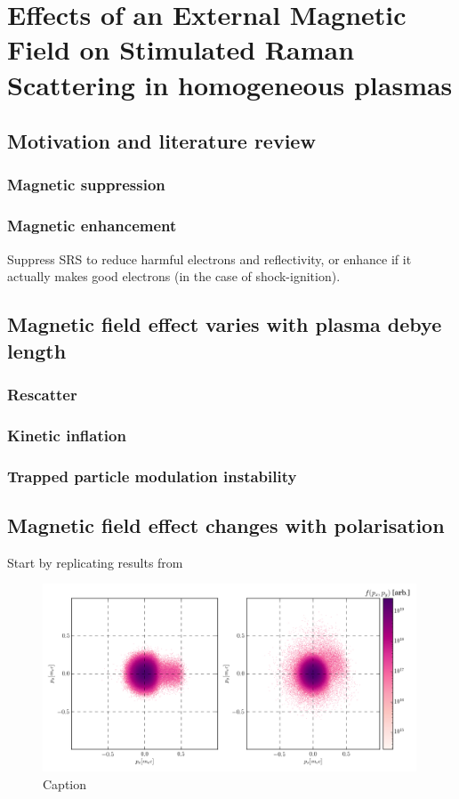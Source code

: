 \chapter{Effects of an External Magnetic Field on Stimulated Raman Scattering in homogeneous plasmas}
\label{chp:magSRS}

\section{Motivation and literature review}
\subsection{Magnetic suppression}
\subsection{Magnetic enhancement}
Suppress SRS to reduce harmful electrons and reflectivity, or enhance if it actually makes good electrons (in the case of shock-ignition).

\section{Magnetic field effect varies with plasma debye length}
\subsection{Rescatter}
\subsection{Kinetic inflation}
\subsection{Trapped particle modulation instability}

\section{Magnetic field effect changes with polarisation}

Start by replicating results from \cite{Winjum2018}

\begin{figure}
    \centering
    \includegraphics[width=0.99\textwidth]{Chapters/C6_magSRS/best_px_py_compare.png}
    \caption{Caption}
    \label{fig:my_label}
\end{figure}{}